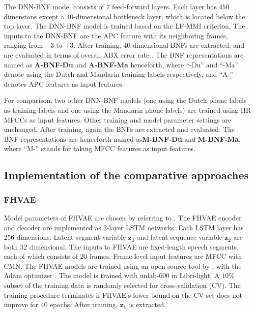 \documentclass[transmag]{IEEEtran}
\begin{document}
The DNN-BNF model consists of $7$ feed-forward layers. Each layer has $450$ dimensions except a $40$-dimensional bottleneck layer, which is located below the top layer. The DNN-BNF model is trained based on the LF-MMI criterion. The inputs to the DNN-BNF are the APC feature with its neighboring frames, ranging from $-3$ to $+3$. After training, $40$-dimensional BNFs are extracted, and are evaluated in terms of overall ABX error rate.. The BNF representations are named as \textbf{A-BNF-Du} and \textbf{A-BNF-Ma} henceforth, where ``-Du'' and ``-Ma'' denote using the Dutch and Mandarin training labels respectively, and “A-” denotes APC features as input features. 

For comparison, two other DNN-BNF models (one using the Dutch phone labels as training labels and one using the Mandarin phone labels) are trained using HR MFCCs as input features.
Other training and model parameter settings are unchanged. After training, again the BNFs are extracted and evaluated. The BNF representations are henceforth named as\textbf{M-BNF-Du} and \textbf{M-BNF-Ma}, where “M-” stands for taking MFCC features as input features.

\subsection{Implementation of the comparative approaches}
\subsubsection{FHVAE}
Model parameters of FHVAE are chosen by referring  to \cite{Feng2019improving}. The FHVAE encoder and decoder are implemented as $2$-layer LSTM networks. Each LSTM layer has $256$ dimensions. Latent segment variable $\bm{z_1}$ and latent sequence variable $\bm{z_2}$ are both $32$ dimensional. The inputs to FHVAE are fixed-length speech segments, each of which consists of $20$ frames. Frame-level input features are MFCC with CMN. The FHVAE models are trained using an open-source tool by \cite{hsu2017nips}, with the Adam optimizer \cite{kingma2014adam}. The model is trained with unlab-600 in Libri-light. A $10\%$ subset of the training data is randomly selected for cross-validation (CV). The training procedure terminates if FHVAE’s lower bound on the CV set does not improve for $40$ epochs. After training, $\bm{z_1}$ is extracted.
\end{document}
